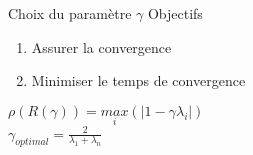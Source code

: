 \documentclass[10pt]{beamer}
\begin{document}
\begin{frame}{Choix du paramètre $\gamma$}
Objectifs
\begin{enumerate}
	\item Assurer la convergence\pause
	\item Minimiser le temps de convergence
\end{enumerate}
\pause
\begin{center}
	$\rho(R(\gamma))=\underset{i}{max}(|1-\gamma\lambda_i|)$\pause \\
	$\gamma_{optimal}=\frac{2}{\lambda_1+\lambda_n}$
\end{center}
\end{frame}
\end{document}
